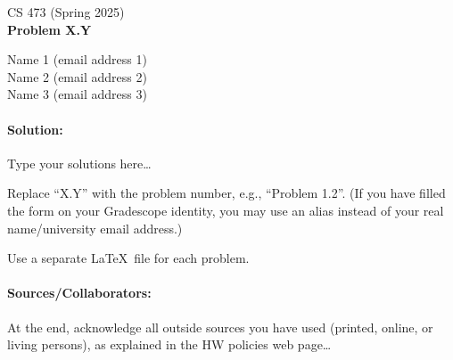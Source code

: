 \documentclass[11pt]{article}
\begin{document}
\begin{minipage}[t]{0.5\textwidth}
\Large
CS 473 (Spring 2025)\\
\bf Problem X.Y
\end{minipage}
\hfill
\begin{minipage}[t]{0.5\textwidth}
\begin{flushright}
\Large
Name 1 (email address 1)\\
Name 2 (email address 2)\\
Name 3 (email address 3)
\end{flushright}
\end{minipage}

\hrulefill

\paragraph{Solution:}
Type your solutions here\ldots

Replace ``X.Y'' with the problem number, e.g., ``Problem 1.2''.
(If you have filled the form on your Gradescope identity, you may use an alias instead of your real name/university email address.)

Use a separate \LaTeX\ file for each problem.


\paragraph{Sources/Collaborators:}
At the end, acknowledge all outside sources you have used (printed, online, or living persons), as explained in the HW policies web page\ldots
\end{document}
